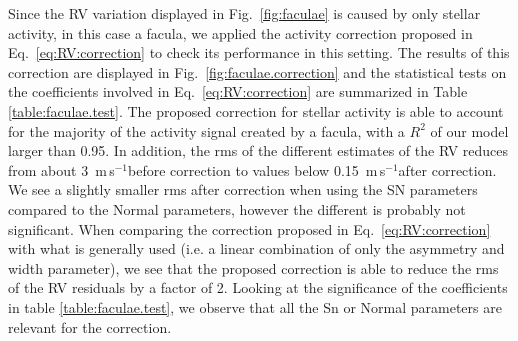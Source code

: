 \documentclass{aa}
\def\ms{\hbox{\,m\,s$^{-1}$}}         %
\begin{document}
Since the RV variation displayed in Fig.~\ref{fig:faculae} is caused by only stellar activity, in this case a facula, we applied the activity correction proposed in Eq.~\ref{eq:RV:correction} to check its performance in this setting. 
The results of this correction are displayed in Fig.~\ref{fig:faculae.correction} and the statistical tests on the coefficients involved in Eq.~\ref{eq:RV:correction} are summarized in Table \ref{table:faculae.test}. 
The proposed correction for stellar activity is able to account for the majority of the activity signal created by a facula, with a $R^2$ of our model larger than 0.95. In addition, the rms of the different estimates of the RV reduces from about 3 \ms before correction to values below 0.15 \ms after correction.
We see a slightly smaller rms after correction when using the SN parameters compared to the Normal parameters, however the different is probably not significant. When comparing the correction proposed in Eq.~\ref{eq:RV:correction} with what is generally used (i.e. a linear combination of only the asymmetry and width parameter), we see that the proposed correction is able to reduce the rms of the RV residuals by a factor of 2. Looking at the significance of the coefficients in table \ref{table:faculae.test}, we observe that all the Sn or Normal parameters are relevant for the correction.
\end{document}
